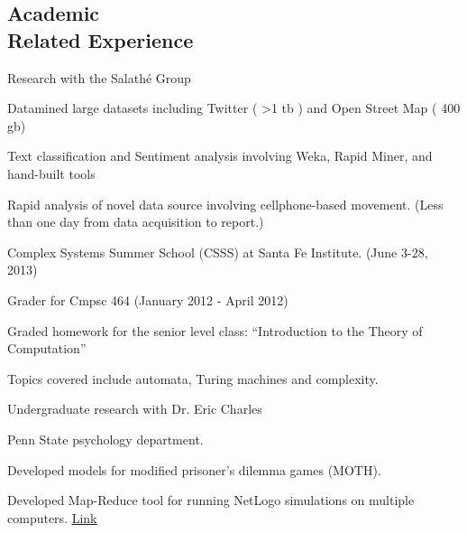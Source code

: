 \documentclass[margin,line]{res}
\newcommand{\linkToUrl}[1]{\underline{\color{blue} \href{#1}{Link}}}
\newenvironment{list1}{
  \begin{list}{\ding{113}}{%
      \setlength{\itemsep}{0in}
      \setlength{\parsep}{0in} \setlength{\parskip}{0in}
      \setlength{\topsep}{0in} \setlength{\partopsep}{0in} 
      \setlength{\leftmargin}{0.17in}}}{\end{list}}
\begin{document}
\begin{resume}
\section{\sc Academic \\Related Experience}
Research with the Salath\'e Group%
\begin{list1}
\item[] Datamined large datasets including Twitter  ( \textgreater 1 tb ) and Open Street Map ( 400 gb)
\item[] Text classification and Sentiment analysis involving Weka, Rapid Miner, and hand-built tools
\item[] Rapid analysis of novel data source involving cellphone-based movement. (Less than one day from data acquisition to report.)
\end{list1}
Complex Systems Summer School (CSSS) at Santa Fe Institute. (June 3-28, 2013)

Grader for Cmpsc 464 (January 2012 - April 2012)
\begin{list1}
\item[] Graded homework for the senior level class: ``Introduction to the Theory of Computation''
\item[] Topics covered include automata, Turing machines and complexity.
\end{list1}
Undergraduate research with Dr. Eric Charles%
\begin{list1}
\item[] Penn State psychology department.
\item[] Developed models for modified prisoner's dilemma games (MOTH).
\item[] Developed Map-Reduce tool for running NetLogo simulations on multiple computers. \linkToUrl{http://bit.ly/12UQ4cq}
\end{list1}





\end{resume}
\end{document}
